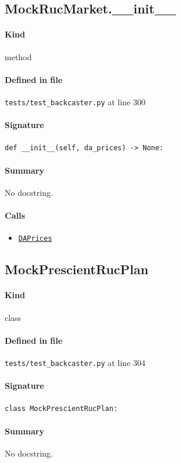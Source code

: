 \documentclass[11pt]{report}
\begin{document}
\subsection{MockRucMarket.\_\_init\_\_}
\label{def:tests-test_backcaster.py:MockRucMarket.__init__:L300}
\paragraph{Kind} method
\paragraph{Defined in file} \texttt{tests/test\_backcaster.py} at line 300
\paragraph{Signature} \texttt{def \_\_init\_\_(self, da\_prices) -> None:}
\paragraph{Summary} No docstring.
\paragraph{Calls}
\begin{itemize}[leftmargin=*]
  \item \hyperref[def:tests-test_backcaster.py:DAPrices:L290]{\texttt{DAPrices}}
\end{itemize}
\subsection{MockPrescientRucPlan}
\label{def:tests-test_backcaster.py:MockPrescientRucPlan:L304}
\paragraph{Kind} class
\paragraph{Defined in file} \texttt{tests/test\_backcaster.py} at line 304
\paragraph{Signature} \texttt{class MockPrescientRucPlan:}
\paragraph{Summary} No docstring.
\end{document}
